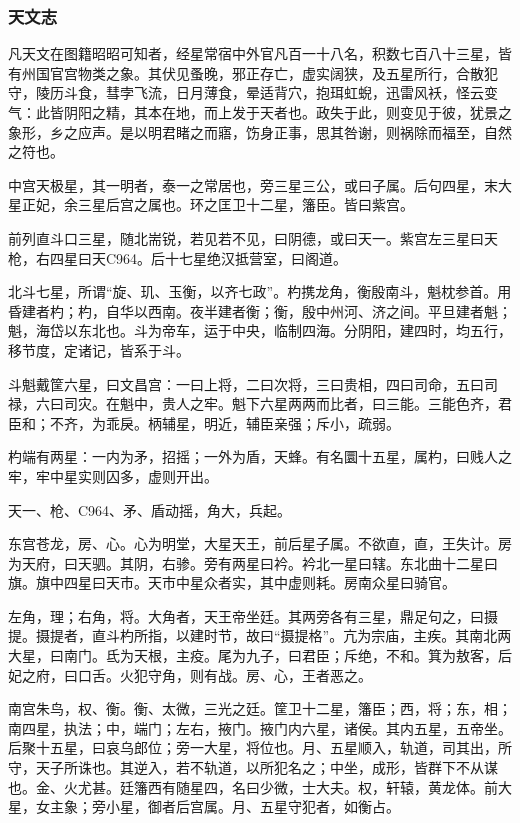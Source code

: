 \documentclass[]{article}
\begin{document}
\hypertarget{header-n1830}{%
\subsubsection{天文志}\label{header-n1830}}

凡天文在图籍昭昭可知者，经星常宿中外官凡百一十八名，积数七百八十三星，皆有州国官宫物类之象。其伏见蚤晚，邪正存亡，虚实阔狭，及五星所行，合散犯守，陵历斗食，彗孛飞流，日月薄食，晕适背穴，抱珥虹蜺，迅雷风袄，怪云变气：此皆阴阳之精，其本在地，而上发于天者也。政失于此，则变见于彼，犹景之象形，乡之应声。是以明君睹之而寤，饬身正事，思其咎谢，则祸除而福至，自然之符也。

中宫天极星，其一明者，泰一之常居也，旁三星三公，或曰子属。后句四星，末大星正妃，余三星后宫之属也。环之匡卫十二星，籓臣。皆曰紫宫。

前列直斗口三星，随北耑锐，若见若不见，曰阴德，或曰天一。紫宫左三星曰天枪，右四星曰天C964。后十七星绝汉抵营室，曰阁道。

北斗七星，所谓``旋、玑、玉衡，以齐七政''。杓携龙角，衡殷南斗，魁枕参首。用昏建者杓；杓，自华以西南。夜半建者衡；衡，殷中州河、济之间。平旦建者魁；魁，海岱以东北也。斗为帝车，运于中央，临制四海。分阴阳，建四时，均五行，移节度，定诸记，皆系于斗。

斗魁戴筐六星，曰文昌宫：一曰上将，二曰次将，三曰贵相，四曰司命，五曰司禄，六曰司灾。在魁中，贵人之牢。魁下六星两两而比者，曰三能。三能色齐，君臣和；不齐，为乖戾。柄辅星，明近，辅臣亲强；斥小，疏弱。

杓端有两星：一内为矛，招摇；一外为盾，天蜂。有名圜十五星，属杓，曰贱人之牢，牢中星实则囚多，虚则开出。

天一、枪、C964、矛、盾动摇，角大，兵起。

东宫苍龙，房、心。心为明堂，大星天王，前后星子属。不欲直，直，王失计。房为天府，曰天驷。其阴，右骖。旁有两星曰衿。衿北一星曰辖。东北曲十二星曰旗。旗中四星曰天市。天市中星众者实，其中虚则耗。房南众星曰骑官。

左角，理；右角，将。大角者，天王帝坐廷。其两旁各有三星，鼎足句之，曰摄提。摄提者，直斗杓所指，以建时节，故曰``摄提格''。亢为宗庙，主疾。其南北两大星，曰南门。氐为天根，主疫。尾为九子，曰君臣；斥绝，不和。箕为敖客，后妃之府，曰口舌。火犯守角，则有战。房、心，王者恶之。

南宫朱鸟，权、衡。衡、太微，三光之廷。筐卫十二星，籓臣；西，将；东，相；南四星，执法；中，端门；左右，掖门。掖门内六星，诸侯。其内五星，五帝坐。后聚十五星，曰哀乌郎位；旁一大星，将位也。月、五星顺入，轨道，司其出，所守，天子所诛也。其逆入，若不轨道，以所犯名之；中坐，成形，皆群下不从谋也。金、火尤甚。廷籓西有随星四，名曰少微，士大夫。权，轩辕，黄龙体。前大星，女主象；旁小星，御者后宫属。月、五星守犯者，如衡占。
\end{document}
